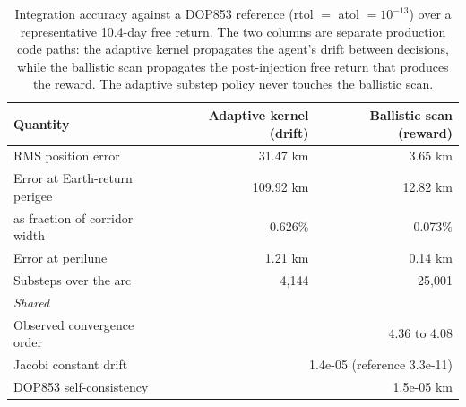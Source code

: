 \begin{table}[hbt!]
\centering
\caption{Integration accuracy against a DOP853 reference (rtol $=$ atol $=10^{-13}$) over a representative 10.4-day free return. The two columns are separate production code paths: the adaptive kernel propagates the agent's drift between decisions, while the ballistic scan propagates the post-injection free return that produces the reward. The adaptive substep policy never touches the ballistic scan.}
\label{tab:integration}
\footnotesize
\begin{tabular}{lrr}
\toprule
Quantity & Adaptive kernel (drift) & Ballistic scan (reward) \\
\midrule
RMS position error & 31.47 km & 3.65 km \\
Error at Earth-return perigee & 109.92 km & 12.82 km \\
\quad as fraction of corridor width & 0.626\% & 0.073\% \\
Error at perilune & 1.21 km & 0.14 km \\
Substeps over the arc & 4,144 & 25,001 \\
\midrule
\multicolumn{3}{l}{\textit{Shared}} \\
Observed convergence order & \multicolumn{2}{r}{4.36 to 4.08} \\
Jacobi constant drift & \multicolumn{2}{r}{1.4e-05 (reference 3.3e-11)} \\
DOP853 self-consistency & \multicolumn{2}{r}{1.5e-05 km} \\
\bottomrule
\end{tabular}
\end{table}